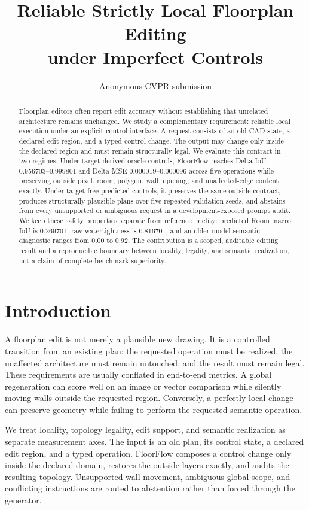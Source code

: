 \documentclass[10pt,twocolumn,letterpaper]{article}
\title{Reliable Strictly Local Floorplan Editing\\under Imperfect Controls}
\author{Anonymous CVPR submission}
\date{}
\begin{document}
\maketitle

\begin{abstract}
Floorplan editors often report edit accuracy without establishing that unrelated
architecture remains unchanged. We study a complementary requirement: reliable
local execution under an explicit control interface. A request consists of an
old CAD state, a declared edit region, and a typed control change. The output may
change only inside the declared region and must remain structurally legal. We
evaluate this contract in two regimes. Under target-derived oracle controls,
FloorFlow reaches Delta-IoU 0.956703--0.999801 and Delta-MSE
0.000019--0.000096 across five operations while preserving outside pixel, room,
polygon, wall, opening, and unaffected-edge content exactly. Under target-free
predicted controls, it preserves the same outside contract, produces structurally
plausible plans over five repeated validation seeds, and abstains from every
unsupported or ambiguous request in a development-exposed prompt audit. We keep
these safety properties separate from reference fidelity: predicted Room macro
IoU is 0.269701, raw watertightness is 0.816701, and an older-model semantic
diagnostic ranges from 0.00 to 0.92. The contribution is a scoped, auditable
editing result and a reproducible boundary between locality, legality, and
semantic realization, not a claim of complete benchmark superiority.
\end{abstract}

\section{Introduction}
A floorplan edit is not merely a plausible new drawing. It is a controlled
transition from an existing plan: the requested operation must be realized, the
unaffected architecture must remain untouched, and the result must remain legal.
These requirements are usually conflated in end-to-end metrics. A global
regeneration can score well on an image or vector comparison while silently
moving walls outside the requested region. Conversely, a perfectly local change
can preserve geometry while failing to perform the requested semantic operation.

We treat locality, topology legality, edit support, and semantic realization as
separate measurement axes. The input is an old plan, its control state, a
declared edit region, and a typed operation. FloorFlow composes a control change
only inside the declared domain, restores the outside layers exactly, and audits
the resulting topology. Unsupported wall movement, ambiguous global scope, and
conflicting instructions are routed to abstention rather than forced through the
generator.
\end{document}
